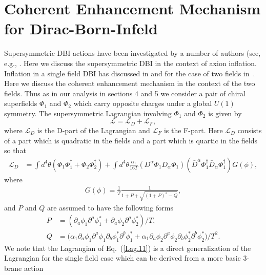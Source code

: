 \documentclass[12pt]{article}
\begin{document}
\section{Coherent Enhancement Mechanism for Dirac-Born-Infeld \label{sec7}}
Supersymmetric DBI actions have been investigated by a number of authors
(see, e.g., \cite{Khoury:2010gb,Khoury:2011da,Baumann:2011nk,Baumann:2011nm,Rocek:1997hi,Tseytlin:1999dj,Ito:2007hy,Billo:2008sp,Sasaki:2012ka,Aoki:2016tod}.
Here we discuss the supersymmetric DBI in the context of axion inflation.
Inflation in a single field DBI has discussed in \cite{Sasaki:2012ka} and for the case of two fields in~\cite{Nath:2018xxe}.
Here we discuss the coherent enhancement mechanism in the context of the two fields.
Thus as in our analysis in sections 4 and 5 we consider a pair of chiral superfields $\Phi_1$ and $\Phi_2$ which carry opposite
charges under a global $U(1)$ symmetry.
The supersymmetric Lagrangian involving $\Phi_1$ and $\Phi_2$ is given by
\begin{equation}
  \mathcal{L}= \mathcal{L}_D+\mathcal{L}_{F},
  \label{1.1}
\end{equation}
where $\mathcal{L}_D$ is the D-part of the Lagrangian and $\mathcal{L}_{F}$ is the F-part. Here $\mathcal{L}_D$
consists of a part which is quadratic in the fields and a part which is quartic in the fields so that
\begin{align}
  \mathcal{L}_D
   & = \int d^4\theta \left(\Phi_1 \Phi_1^\dagger + \Phi_2 \Phi_2^\dagger \right)+ \int d^4\theta
  \frac{\alpha_1}{16T}\left(D^\alpha \Phi_1 D_\alpha \Phi_1\right)\left({\bar{D}}^{\dot{\alpha}}\Phi_1^\dagger {\bar{D}}_{\dot{\alpha}}\Phi_1^\dagger \right)
  G(\phi),
  \label{Lag.11}
\end{align}
where
\begin{align}
  G(\phi) = \frac{1}{T}\frac{1}{1+ P +\sqrt{(1+P)^2 -Q}},
\end{align}
and $P$ and $Q$ are assumed to have the following forms
\begin{align}
  P & = (\partial_a\phi_1 \partial^a \phi^*_1 + \partial_a\phi_2 \partial^a \phi^*_2)/T, \nonumber\\
  Q & = \Big(
  \alpha_1\partial_a \phi_1 \partial^a \phi_1 \partial_b \phi^*_1 \partial^b \phi^*_1
  + \alpha_1 \partial_a \phi_2 \partial^a \phi_2 \partial_b \phi^*_2 \partial^b \phi^*_2
  \Big) / T^2.
  \label{Lag.22}
\end{align}
We note that the Lagrangian of Eq.~(\ref{Lag.11}) is a direct generalization of the Lagrangian for the single field
case which can be derived from a more basic 3-brane action
\end{document}
